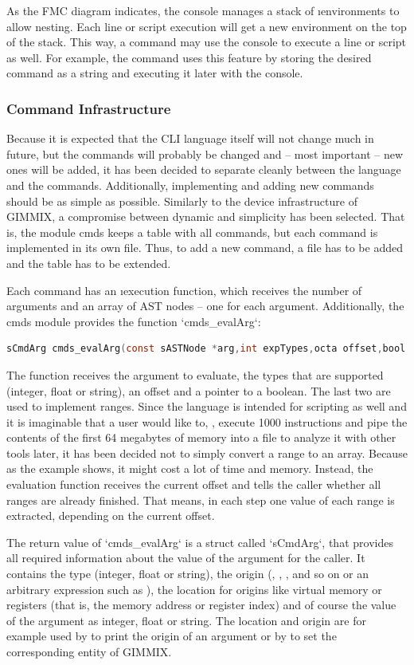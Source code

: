 As the FMC diagram indicates, the console manages a stack of \i{environments} to allow nesting. Each line or script execution will get a new environment on the top of the stack. This way, a command may use the console to execute a line or script as well. For example, the command  uses this feature by storing the desired command as a string and executing it later with the console.

\subsubsection{Command Infrastructure}

Because it is expected that the CLI language itself will not change much in future, but the commands will probably be changed and -- most important -- new ones will be added, it has been decided to separate cleanly between the language and the commands. Additionally, implementing and adding new commands should be as simple as possible. Similarly to the device infrastructure of GIMMIX, a compromise between dynamic and simplicity has been selected. That is, the module cmds keeps a table with all commands, but each command is implemented in its own file. Thus, to add a new command, a file has to be added and the table has to be extended.

Each command has an \i{execution function}, which receives the number of arguments and an array of \gls{AST} nodes -- one for each argument. Additionally, the cmds module provides the function `cmds_evalArg`:
\begin{lstlisting}[language=C]
sCmdArg cmds_evalArg(const sASTNode *arg,int expTypes,octa offset,bool *finished);
\end{lstlisting}
The function receives the argument to evaluate, the types that are supported (integer, float or string), an offset and a pointer to a boolean. The last two are used to implement ranges. Since the language is intended for scripting as well and it is imaginable that a user would like to, \eg, execute 1000 instructions and pipe the contents of the first 64 megabytes of memory into a file to analyze it with other tools later, it has been decided not to simply convert a range to an array. Because as the example shows, it might cost a lot of time and memory. Instead, the evaluation function receives the current offset and tells the caller whether all ranges are already finished. That means, in each step one value of each range is extracted, depending on the current offset.

The return value of `cmds_evalArg` is a struct called `sCmdArg`, that provides all required information about the value of the argument for the caller. It contains the type (integer, float or string), the origin (, , \gcmd{\$}, and so on or an arbitrary expression such as ), the location for origins like virtual memory or registers (that is, the memory address or register index) and of course the value of the argument as integer, float or string. The location and origin are for example used by  to print the origin of an argument or by  to set the corresponding entity of GIMMIX.


